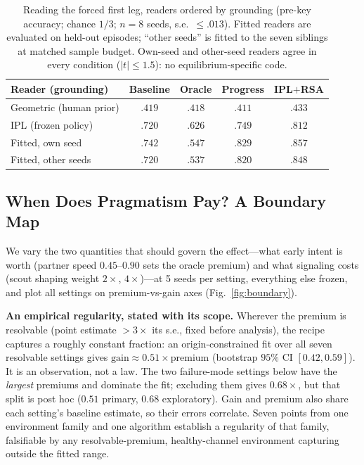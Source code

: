 \documentclass[sigconf,review,anonymous]{acmart}
\begin{document}
\begin{table}[t]
\centering
\caption{Reading the forced first leg, readers ordered by grounding (pre-key accuracy; chance $1/3$; $n{=}8$ seeds, s.e.\ $\le.013$). Fitted readers are evaluated on held-out episodes; ``other seeds'' is fitted to the seven siblings at matched sample budget. Own-seed and other-seed readers agree in every condition ($|t|{\le}1.5$): no equilibrium-specific code.}
\label{tab:readers}
\small
\setlength{\tabcolsep}{5pt}
\begin{tabular}{@{}lcccc@{}}
\toprule
\textbf{Reader (grounding)} & Baseline & Oracle & Progress & IPL$+$RSA \\
\midrule
Geometric (human prior) & $.419$ & $.418$ & $.411$ & $.433$ \\
IPL (frozen policy) & $.720$ & $.626$ & $.749$ & $.812$ \\
Fitted, own seed & $.742$ & $.547$ & $.829$ & $.857$ \\
Fitted, other seeds & $.720$ & $.537$ & $.820$ & $.848$ \\
\bottomrule
\end{tabular}
\end{table}

\subsection{When Does Pragmatism Pay? A Boundary Map}
\label{ssec:boundary}

We vary the two quantities that should govern the effect---what early intent is worth (partner speed $0.45$--$0.90$ sets the oracle premium) and what signaling costs (scout shaping weight $2\times$, $4\times$)---at 5 seeds per setting, everything else frozen, and plot all settings on premium-vs-gain axes (Fig.~\ref{fig:boundary}).

\textbf{An empirical regularity, stated with its scope.} Wherever the premium is resolvable (point estimate $>3\times$ its s.e., fixed before analysis), the recipe captures a roughly constant fraction: an origin-constrained fit over all seven resolvable settings gives $\text{gain} \approx 0.51 \times \text{premium}$ (bootstrap $95\%$ CI $[0.42, 0.59]$). It is an observation, not a law. The two failure-mode settings below have the \emph{largest} premiums and dominate the fit; excluding them gives $0.68\times$, but that split is post hoc ($0.51$ primary, $0.68$ exploratory). Gain and premium also share each setting's baseline estimate, so their errors correlate. Seven points from one environment family and one algorithm establish a regularity of that family, falsifiable by any resolvable-premium, healthy-channel environment capturing outside the fitted range.
\end{document}

